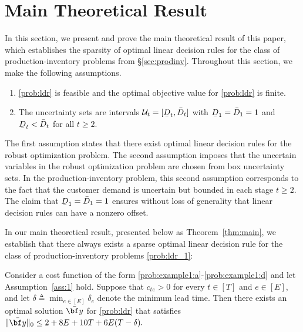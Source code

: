 \documentclass[nonblindrev,mnsc]{informs3} %
\newcommand{\by}{{\bf y}}
\newcommand{\ubar}[1]{\text{\b{$#1$}}}
\begin{document}
\section{Main Theoretical Result} \label{sec:main_result}
In this section, we present and prove the main theoretical result of this paper, which establishes the sparsity of optimal linear decision rules for the class of production-inventory problems from \S\ref{sec:prodinv}. 
Throughout this section, we make the following assumptions. 
\begin{assumption}\label{ass:1}
\begin{enumerate}[label=\alph*.,ref={\ref{ass:1}\alph*}]
    \item  \eqref{prob:ldr} is feasible and the optimal objective value for \eqref{prob:ldr} is finite.\label{ass:1a}
    \item The uncertainty sets are intervals  $\mathcal{U}_t=[\ubar{D}_t, \bar{D}_t]$ with $\ubar{D}_1 = \bar{D}_1 = 1$ 
    and $\ubar{D}_t < \bar{D}_t$ for all $t \ge 2$.\label{ass:1b}
\end{enumerate}
\end{assumption}
The first assumption states that there exist   optimal linear decision rules for the robust optimization problem. 
The second assumption imposes that the uncertain variables in the robust optimization problem are chosen from box uncertainty sets. In the production-inventory problem, this second assumption corresponds to the fact that the customer demand is uncertain but bounded in each stage $t \ge 2$. The claim that $\ubar{D}_1 = \bar{D}_1 = 1$ ensures without loss of generality that linear decision rules can have a nonzero offset. 

In our main theoretical result, presented below as Theorem~\ref{thm:main}, we establish that there  always exists a sparse optimal linear decision rule for the class of production-inventory problems \eqref{prob:ldr_1}:

\begin{theorem} \label{thm:main}
Consider a cost function of the form \eqref{prob:example1:a}-\eqref{prob:example1:d} and let   Assumption~\ref{ass:1} hold. Suppose that $c_{te}>0$ for every $t\in [T]$ and $e\in [E]$, and let $\delta \triangleq\min_{e\in [E]} \delta_e$ denote the minimum lead time. Then there exists an optimal solution $\bar{\by}$ for \eqref{prob:ldr} that satisfies $\| \bar{\by} \|_0 \le  2 + 8E + 10T + 6E(T-\delta).$
\end{theorem}
\end{document}
